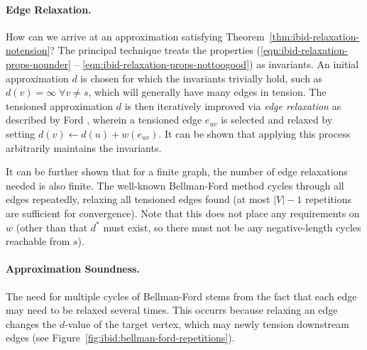\paragraph{Edge Relaxation.}
How can we arrive at an approximation
satisfying Theorem~\ref{thm:ibid-relaxation-notension}?
The principal technique treats the properties
(\ref{eqn:ibid-relaxation-props-nounder} --
\ref{eqn:ibid-relaxation-props-nottoogood}) as invariants.
An initial approximation $d$ is chosen for which the invariants
trivially hold,
such as $d(v) = \infty \;\forall v \neq s$,
which will generally have many edges in tension.
The tensioned approximation $d$ is then iteratively improved
via \emph{edge relaxation}
as described by Ford \citep{ford1955networkflowtheory},
wherein a tensioned edge $e_{uv}$ is selected and relaxed
by setting $d(v) \leftarrow d(u) + w(e_{uv})$.
It can be shown that applying this process arbitrarily
maintains the invariants.

It can be further shown that for a finite graph,
the number of edge relaxations needed is also finite.
The well-known Bellman-Ford method
\citep{shimbel1955communicationnets, bellman1958routing,
moore1959spmaze}
cycles through all edges repeatedly,
relaxing all tensioned edges found
(at most $|V|-1$ repetitions are sufficient for convergence).
Note that this does not place any requirements on $w$
(other than that $d^*$ must exist, so there must not be
any negative-length cycles reachable from $s$).

\paragraph{Approximation Soundness.}
The need for multiple cycles of Bellman-Ford stems from the fact
that each edge may need to be relaxed several times.
This occurrs because relaxing an edge changes the
$d$-value of the target vertex,
which may newly tension downstream edges
(see Figure~\ref{fig:ibid:bellman-ford-repetitions}).

